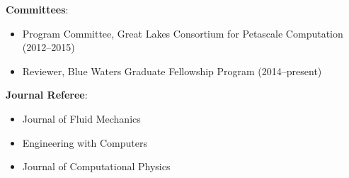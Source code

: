 

\textbf{Committees}:
\begin{itemize}
\itemsep 0pt
\item Program Committee, Great Lakes Consortium for Petascale Computation (2012--2015)
\item Reviewer, Blue Waters Graduate Fellowship Program (2014--present)
\end{itemize}

\blankline


\textbf{Journal Referee}:
\begin{itemize}
\itemsep 0pt
         \item Journal of Fluid Mechanics
         \item Engineering with Computers
         \item Journal of Computational Physics
\end{itemize}
